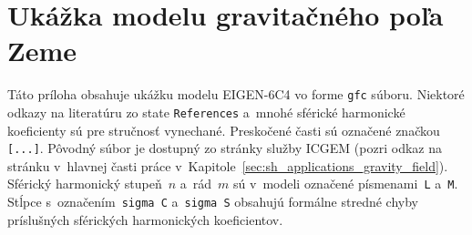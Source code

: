 \documentclass[a4paper, 12pt]{book}
\begin{document}
\chapter{Ukážka modelu gravitačného poľa Zeme}
\label{app:gfc_file}

Táto príloha obsahuje ukážku modelu EIGEN-6C4 vo forme \texttt{gfc} súboru.  
Niektoré odkazy na literatúru zo state \texttt{References} a~mnohé sférické 
harmonické koeficienty sú pre stručnosť vynechané.  Preskočené časti sú 
označené značkou \texttt{[...]}.  Pôvodný súbor je dostupný zo stránky služby 
ICGEM (pozri odkaz na stránku v~hlavnej časti práce 
v~Kapitole~\ref{sec:sh_applications_gravity_field}).  Sférický harmonický 
stupeň~$n$ a~rád~$m$ sú v~modeli označené písmenami~\texttt{L} a~\texttt{M}.  
Stĺpce s~označením~\texttt{sigma C} a~\texttt{sigma S} obsahujú formálne 
stredné chyby príslušných sférických harmonických koeficientov.

\vspace{10ex}
\end{document}
